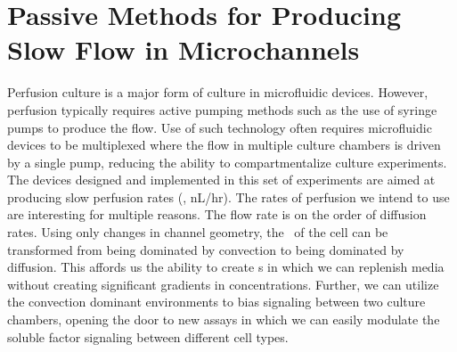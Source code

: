 



%		
%		
%		


\section{Passive Methods for Producing Slow Flow in Microchannels} \label{chap:slowFlow}

Perfusion culture is a major form of culture in microfluidic devices. However, perfusion typically requires active pumping methods such as the use of syringe pumps to produce the flow. Use of such technology often requires microfluidic devices to be multiplexed where the flow in multiple culture chambers is driven by a single pump, reducing the ability to compartmentalize culture experiments. The devices designed and implemented in this set of experiments are aimed at producing slow perfusion rates (\ie , nL/hr). The rates of perfusion we intend to use are interesting for multiple reasons. The flow rate is on the order of diffusion rates. Using only changes in channel geometry, the \me\ of the cell can be transformed from being dominated by convection to being dominated by diffusion. This affords us the ability to create \me s in which we can replenish media without creating significant gradients in concentrations. Further, we can utilize the convection dominant environments to bias signaling between two culture chambers, opening the door to new assays in which we can easily modulate the soluble factor signaling between different cell types.

